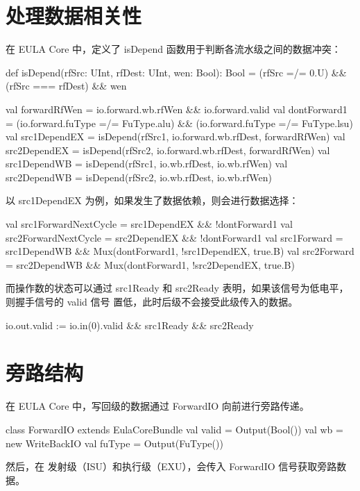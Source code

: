 \section{处理数据相关性}\label{sec:03-base-cpu-008}

在 EULA Core 中，定义了 isDepend 函数用于判断各流水级之间的数据冲突：

\begin{CodeBlock}[language=BookScala]
  def isDepend(rfSrc: UInt, rfDest: UInt, wen: Bool): Bool = (rfSrc =/= 0.U) && (rfSrc === rfDest) && wen

  val forwardRfWen = io.forward.wb.rfWen && io.forward.valid
  val dontForward1 = (io.forward.fuType =/= FuType.alu) && (io.forward.fuType =/= FuType.lsu)
  val src1DependEX = isDepend(rfSrc1, io.forward.wb.rfDest, forwardRfWen)
  val src2DependEX = isDepend(rfSrc2, io.forward.wb.rfDest, forwardRfWen)
  val src1DependWB = isDepend(rfSrc1, io.wb.rfDest, io.wb.rfWen)
  val src2DependWB = isDepend(rfSrc2, io.wb.rfDest, io.wb.rfWen)
\end{CodeBlock}

以 src1DependEX 为例，如果发生了数据依赖，则会进行数据选择：

\begin{CodeBlock}[language=BookScala]
val src1ForwardNextCycle = src1DependEX && !dontForward1
val src2ForwardNextCycle = src2DependEX && !dontForward1
val src1Forward = src1DependWB && Mux(dontForward1, !src1DependEX, true.B)
val src2Forward = src2DependWB && Mux(dontForward1, !src2DependEX, true.B)
\end{CodeBlock}

而操作数的状态可以通过 src1Ready 和 src2Ready 表明，如果该信号为低电平，则握手信号的 valid 信号 置低，此时后级不会接受此级传入的数据。

\begin{CodeBlock}[language=BookScala]
io.out.valid := io.in(0).valid && src1Ready && src2Ready
\end{CodeBlock}

\section{旁路结构}\label{sec:03-base-cpu-009}

在 EULA Core 中，写回级的数据通过 ForwardIO 向前进行旁路传递。

\begin{CodeBlock}[language=BookScala]
class ForwardIO extends EulaCoreBundle {
  val valid = Output(Bool())
  val wb = new WriteBackIO
  val fuType = Output(FuType())
}
\end{CodeBlock}

然后，在 发射级（ISU）和执行级（EXU），会传入 ForwardIO 信号获取旁路数据。
